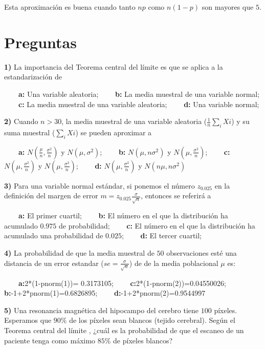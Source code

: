 \documentclass[
]{book}
\begin{document}
Esta aproximación es buena cuando tanto \(np\) como \(n(1-p)\) son mayores que \(5\).

\hypertarget{preguntas-8}{%
\section{Preguntas}\label{preguntas-8}}

\textbf{1)} La importancia del Teorema central del límite es que se aplica a la estandarización de

\textbf{\(\qquad\)a:} Una variable aleatoria;
\textbf{\(\qquad\)b:} La media muestral de una variable normal;
\textbf{\(\qquad\)c:} La media muestral de una variable aleatoria;
\textbf{\(\qquad\)d:} Una variable normal;

\textbf{2)} Cuando \(n>30\), la media muestral de una variable aleatoria (\(\frac{1}{n}\sum_i Xi\)) y su suma muestral (\(\sum_i Xi\)) se pueden aproximar a

\textbf{\(\qquad\)a:} \(N(\frac{\mu}{n}, \frac{\sigma^2}{n})\) y \(N(\mu, \sigma^2)\);
\textbf{\(\qquad\)b:} \(N(\mu, n\sigma^2)\) y \(N(\mu, \frac{\sigma^2}{n})\);
\textbf{\(\qquad\)c:} \(N(\mu, \frac{\sigma^2}{n})\) y \(N(\mu, \frac{\sigma^2}{n})\);
\textbf{\(\qquad\)d:} \(N(\mu, \frac{\sigma^2}{n})\) y \(N(n\mu, n\sigma^2)\)

\textbf{3)} Para una variable normal estándar, si ponemos el número \(z_{0.025}\) en la definición del margen de error \(m=z_{0.025} \frac{\sigma}{\sqrt{n}}\), entonces se referirá a

\textbf{\(\qquad\)a:} El primer cuartil; \textbf{\(\qquad\)b:} El número en el que la distribución ha acumulado \(0.975\) de probabilidad; \textbf{\(\qquad\)c:} El número en el que la distribución ha acumulado una probabilidad de \(0.025\); \textbf{\(\qquad\)d:} El tercer cuartil;

\textbf{4)} La probabilidad de que la media muestral de \(50\) observaciones esté una distancia de un error estandar (\(se=\frac{\sigma}{\sqrt{n}}\)) de de la media poblacional \(\mu\) es:

\textbf{\(\qquad\)a:}2*(1-pnorm(1))= 0.3173105; \textbf{\(\qquad\)c:}2*(1-pnorm(2))=0.04550026;
\textbf{\(\qquad\)b:}-1+2*pnorm(1)=0.6826895;
\textbf{\(\qquad\)d:}-1+2*pnorm(2)=0.9544997

\textbf{5)} Una resonancia magnética del hipocampo del cerebro tiene \(100\) píxeles. Esperamos que \(90\%\) de los píxeles sean blancos (tejido cerebral). Según el Teorema central del límite , ¿cuál es la probabilidad de que el escaneo de un paciente tenga como máximo \(85\%\) de píxeles blancos?
\end{document}
